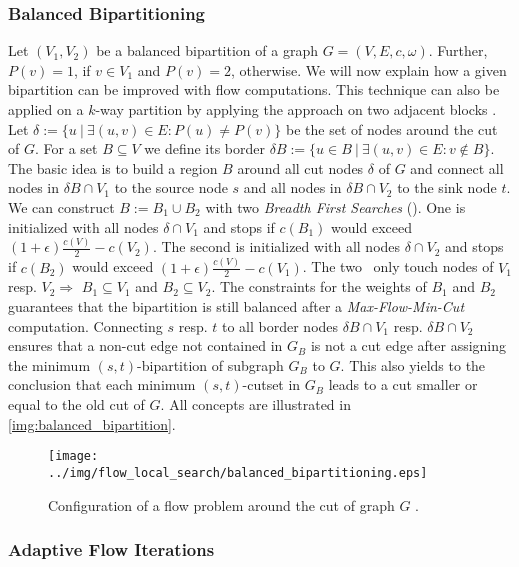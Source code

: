 \subsubsection{Balanced Bipartitioning}
\label{sec:balanced_bipartitioning}
Let $(V_1,V_2)$ be a balanced bipartition of a graph $G = (V,E,c,\omega)$. 
Further, $P(v) = 1$, if $v \in V_1$ and
$P(v) = 2$, otherwise. We will now explain how a given bipartition 
can be improved with flow computations. This technique can also be applied on a $k$-way 
partition by applying the approach on two adjacent blocks \cite{sanders2011engineering}. \\
Let $\delta := \{ u\ |\ \exists (u,v) \in E: P(u) \neq P(v) \}$ be the set of nodes
around the cut of $G$. For a set $B \subseteq V$ we define its border 
$\delta B := \{u \in B\ |\ \exists (u,v) \in E: v \notin B\}$.
The basic idea is to build a region $B$ around all cut nodes $\delta$ of 
$G$ and connect all nodes in $\delta B \cap V_1$ to the source node $s$ and all nodes in 
$\delta B \cap V_2$ to the sink node $t$. \\
We can construct $B := B_1 \cup B_2$ with two \emph{Breadth First Searches} (\BFS). 
One is initialized with all nodes $\delta \cap V_1$ and stops if $c(B_1)$ would 
exceed $(1+\epsilon)\frac{c(V)}{2} - c(V_2)$. The second is initialized with 
all nodes $\delta \cap V_2$ and stops if $c(B_2)$ would exceed 
$(1+\epsilon)\frac{c(V)}{2} - c(V_1)$. The two \BFS~only touch nodes of $V_1$ resp. $V_2 \Rightarrow$
$B_1 \subseteq V_1$ and $B_2 \subseteq V_2$. The constraints for the weights of $B_1$
and $B_2$ guarantees that the bipartition is still balanced after a \emph{Max-Flow-Min-Cut}
computation. Connecting $s$ resp. $t$ to all border nodes $\delta B \cap V_1$ resp.
$\delta B \cap V_2$ ensures that a non-cut edge not contained in $G_B$ is not a cut edge after
assigning the minimum $(s,t)$-bipartition of subgraph $G_B$ to $G$. This also yields to 
the conclusion that each minimum $(s,t)$-cutset in $G_B$ leads to a cut smaller or 
equal to the old cut of $G$. All concepts are illustrated in \autoref{img:balanced_bipartition}.

\begin{figure}
\centering
\texttt{[image: ../img/flow\_local\_search/balanced\_bipartitioning.eps]}
\caption{Configuration of a flow problem around the cut of graph $G$ \cite{andersen2008algorithm}.}
\label{img:balanced_bipartition}
\end{figure}


\subsubsection{Adaptive Flow Iterations}
\label{sec:adaptive_flow_iterations}

